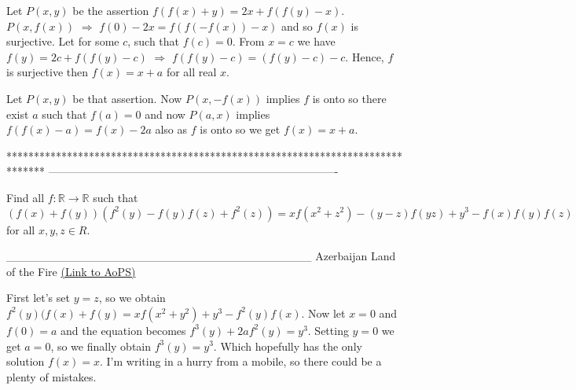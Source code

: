 \begin{solution}
	Let $P(x,y)$ be the assertion $ f(f(x)+y)=2x+f(f(y)-x). $ 
$P(x,f(x))$ $ \Rightarrow $ $f(0)-2x=f(f(-f(x))-x) $ and so $f(x)$ is surjective. 
Let  for some $c$, such that $f(c)=0$.
From $x=c$  we have $ f(y)=2c+f(f(y)-c) $ $ \Rightarrow $ 
$f(f(y)-c)=(f(y)-c)-c$.  
Hence,  $f$ is surjective then $f(x)=x+a$  for all real $x$.
\end{solution}



\begin{solution}
	Let $P(x,y)$ be that assertion. Now $P(x,-f(x))$ implies $f$ is onto so there exist $a$ such that $f(a)=0$ and now $P(a,x)$ implies $f(f(x)-a)=f(x)-2a$ also as $f$ is onto so we get $f(x)=x+a$.
\end{solution}
*******************************************************************************
-------------------------------------------------------------------------------

\begin{problem}
	Find all $f: \mathbb{R}\to\mathbb{R}$ such that 
$(f(x)+f(y))(f^2(y)-f(y)f(z)+f^2(z))=xf(x^2+z^2)-(y-z)f(yz)+y^3-f(x)f(y)f(z)$ for all   $x,y,z{\in}R$.

_____________________________________
Azerbaijan Land of the Fire 
	\flushright \href{https://artofproblemsolving.com/community/c6h531982}{(Link to AoPS)}
\end{problem}



\begin{solution}
	First let's set $y=z$, so we obtain $f^2 (y)( f(x)+f(y)=xf(x^2+y^2)+y^3-f^2(y)f(x)$. Now let $x=0$ and $f(0)=a$ and the equation becomes $f^3(y)+2af^2(y)=y^3$. Setting $y=0$ we get $a=0$, so we finally obtain $f^3(y)=y^3$. Which hopefully has the only solution $f(x)=x$. I'm writing in a hurry from a mobile, so there could be a plenty of mistakes.
\end{solution}



